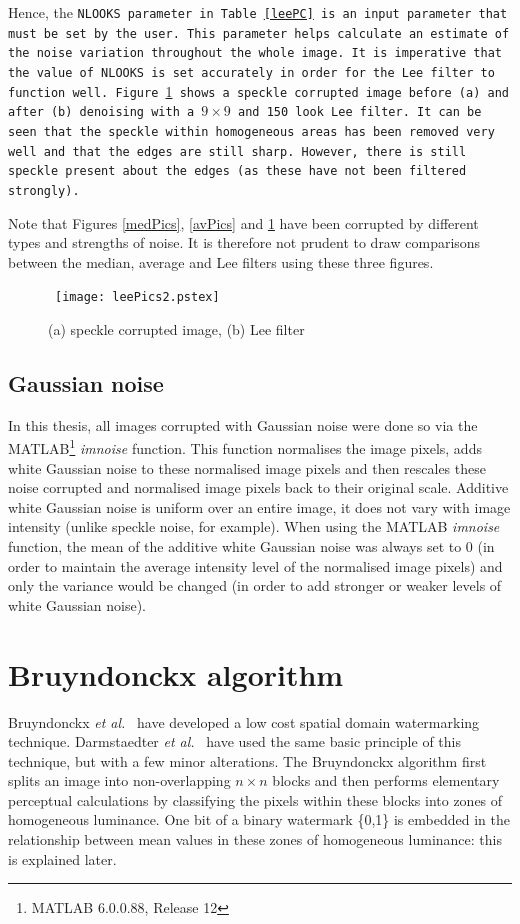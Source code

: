 \documentclass[12pt]{report}
\begin{document}
Hence, the \tt NLOOKS \rm parameter in Table \ref{leePC} is an input parameter 
that must be set by the user. 
This parameter helps calculate an estimate of the noise variation throughout the
whole image. 
It is imperative that the value of \tt NLOOKS \rm is set accurately
in order for the Lee filter to function well.
Figure \ref{leePics2} shows a speckle corrupted image before (a) and after (b) denoising with a
$9 \times 9$ and 150 look Lee filter.
It can be seen that the speckle within homogeneous areas has been removed 
very well and that the edges are still sharp. However, there is still speckle present about the edges 
(as these have not been filtered strongly).

Note that Figures \ref{medPics}, \ref{avPics} and \ref{leePics2} have been corrupted by different
types and strengths of noise. It is therefore not prudent to draw comparisons between the 
median, average and Lee filters using these three figures.

\begin{figure}[htb]
	\centerline{ \hbox{
		\texttt{[image: leePics2.pstex]}
	}}
		\caption{(a) speckle corrupted image, (b) Lee filter}
		\label{leePics2}
\end{figure}


\section{Gaussian noise}
In this thesis, all images corrupted with Gaussian noise were done so via the
MATLAB\footnote{MATLAB 6.0.0.88, Release 12} \emph{imnoise} function. This function normalises the image pixels, adds white Gaussian noise to these
normalised image pixels and then rescales these noise corrupted and normalised image pixels back to their original scale. 
Additive white Gaussian noise is uniform over an entire image, it does not vary with image intensity (unlike speckle noise, for example).
When using the MATLAB \emph{imnoise} function, the mean of the additive white Gaussian noise was always set to 0 (in order to 
maintain the average intensity level of the normalised image pixels) and only the variance would be changed (in order to
add stronger or weaker levels of white Gaussian noise).

			
\chapter{Bruyndonckx algorithm}
\label{chapter:bruynAlg}

	Bruyndonckx \emph{et al.}~\cite{BKX:bruyn1Pap} have developed a low cost spatial 
	domain watermarking technique. Darmstaedter \emph{et al.}~\cite{ECCb4:darm1, ECCb4:darm2} have used the same basic principle of
	this technique, but with a few minor alterations.
	The Bruyndonckx algorithm first splits an image into non-overlapping $n \times n$ blocks and then performs elementary perceptual 
	calculations by  
	classifying the pixels within these blocks into zones of homogeneous luminance.
	One bit of a binary watermark \{0,1\} is embedded in the relationship between mean values in these zones of 
	homogeneous luminance: this is explained later.
\end{document}
